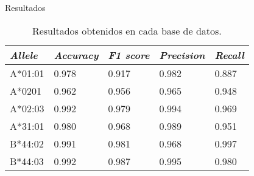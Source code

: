 \documentclass[10pt]{beamer}
\newcommand{\1}{
	\setbeamertemplate{background}{
		\texttt{[image: img/1]}
		\tikz[overlay] \fill[fill opacity=0.75,fill=white] (0,0) rectangle (-\paperwidth,\paperheight);
	}
}
\begin{document}
\begin{frame}{Resultados}{}
\begin{table}[]
	\centering
	\caption{Resultados obtenidos en cada base de datos. }
	\label{tab:results}
	\setlength{\tabcolsep}{0.8em} %
	{\renewcommand{\arraystretch}{1.3}%
		\begin{tabular}{lllll}
			\hline
			\textit{\textbf{Allele}} & \textit{\textbf{Accuracy}} & \textit{\textbf{F1 score}} & \textit{\textbf{Precision}} & \textit{\textbf{Recall}} \\
			\hline
			A*01:01                  & 0.978                      & 0.917                      & 0.982                       & 0.887                    \\
			A*0201                   & 0.962                      & 0.956                      & 0.965                       & 0.948                    \\
			A*02:03                  & 0.992                      & 0.979                      & 0.994                       & 0.969                    \\
			A*31:01                  & 0.980                      & 0.968                      & 0.989                       & 0.951                    \\
			B*44:02                  & 0.991                      & 0.981                      & 0.968                       & 0.997                    \\
			B*44:03                  & 0.992                      & 0.987                      & 0.995                       & 0.980                   
		\end{tabular}
	}
\end{table}
\end{frame}
\end{document}
